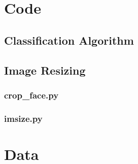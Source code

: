 \documentclass[hidelinks,11pt]{article}
\begin{document}
\pagebreak
\begin{appendices}
  \section{Code}
  \label{sec:app:code}

  \subsection{Classification Algorithm}
  

  \subsection{Image Resizing}
  \subsubsection{crop\_face.py}
  

  \subsubsection{imsize.py}
  

  \pagebreak
  \section{Data}
  \label{sec:app:data}


\end{appendices}
\end{document}
